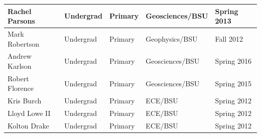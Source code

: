 \documentclass[11pt]{article}
\begin{document}
\begin{table}[!htbp]
\begin{tabular}{|l|l|l|l|l|}
Rachel Parsons & Undergrad & Primary & Geosciences/BSU & Spring 2013 \\ \hline
Mark Robertson & Undergrad & Primary & Geophysics/BSU & Fall 2012 \\ \hline
Andrew Karlson & Undergrad & Primary & Geosciences/BSU & Spring 2016 \\ \hline
Robert Florence & Undergrad & Primary & Geosciences/BSU & Spring 2015 \\ \hline
Kris Burch & Undergrad & Primary & ECE/BSU & Spring 2012 \\ \hline
Lloyd Lowe II & Undergrad & Primary & ECE/BSU & Spring 2012 \\ \hline
Kolton Drake & Undergrad & Primary & ECE/BSU & Spring 2012 \\ \hline
\end{tabular}
\end{table}

\pagebreak
\end{document}
